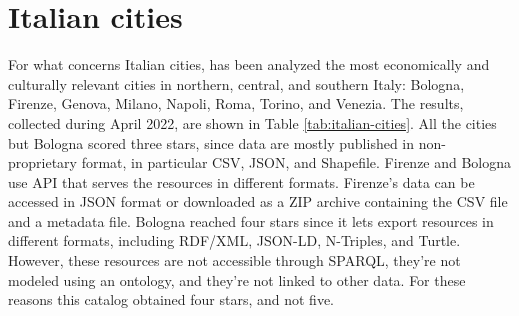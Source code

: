 \section{Italian cities}
\label{sec:italian-cities}

For what concerns Italian cities, has been analyzed the most economically and culturally relevant cities in northern, central, and southern Italy: Bologna, Firenze, Genova, Milano, Napoli, Roma, Torino, and Venezia. The results, collected during April 2022, are shown in Table \ref{tab:italian-cities}. All the cities but Bologna scored three stars, since data are mostly published in non-proprietary format, in particular \ac{CSV}, \ac{JSON}, and Shapefile. Firenze and Bologna use \acs{API} that serves the resources in different formats. Firenze's data can be accessed in \acs{JSON} format or downloaded as a ZIP archive containing the \ac{CSV} file and a metadata file. Bologna reached four stars since it lets export resources in different formats, including \ac{RDF}/\ac{XML}, \ac{JSON}-LD, N-Triples, and Turtle. However, these resources are not accessible through \ac{SPARQL}, they're not modeled using an ontology, and they're not linked to other data. For these reasons this catalog obtained four stars, and not five.

